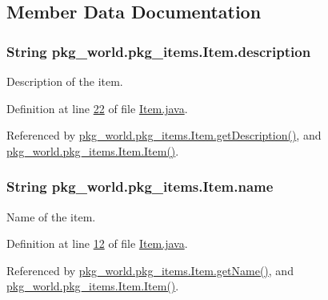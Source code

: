 \subsection{Member Data Documentation}
\hypertarget{classpkg__world_1_1pkg__items_1_1Item_a8c9a4a4ced5e41295c411fcdd1f3ec72}{
\subsubsection[{description}]{\setlength{\rightskip}{0pt plus 5cm}String pkg\-\_\-world.\-pkg\-\_\-items.\-Item.\-description\hspace{0.3cm}{\ttfamily [private]}}}\label{classpkg__world_1_1pkg__items_1_1Item_a8c9a4a4ced5e41295c411fcdd1f3ec72}


Description of the item. 



Definition at line \hyperlink{Item_8java_source_l00022}{22} of file \hyperlink{Item_8java_source}{Item.\-java}.



Referenced by \hyperlink{Item_8java_source_l00056}{pkg\-\_\-world.\-pkg\-\_\-items.\-Item.\-get\-Description()}, and \hyperlink{Item_8java_source_l00030}{pkg\-\_\-world.\-pkg\-\_\-items.\-Item.\-Item()}.

\hypertarget{classpkg__world_1_1pkg__items_1_1Item_ad4d60e860c8a6eb753f24a84cda24c60}{
\subsubsection[{name}]{\setlength{\rightskip}{0pt plus 5cm}String pkg\-\_\-world.\-pkg\-\_\-items.\-Item.\-name\hspace{0.3cm}{\ttfamily [private]}}}\label{classpkg__world_1_1pkg__items_1_1Item_ad4d60e860c8a6eb753f24a84cda24c60}


Name of the item. 



Definition at line \hyperlink{Item_8java_source_l00012}{12} of file \hyperlink{Item_8java_source}{Item.\-java}.



Referenced by \hyperlink{Item_8java_source_l00040}{pkg\-\_\-world.\-pkg\-\_\-items.\-Item.\-get\-Name()}, and \hyperlink{Item_8java_source_l00030}{pkg\-\_\-world.\-pkg\-\_\-items.\-Item.\-Item()}.

